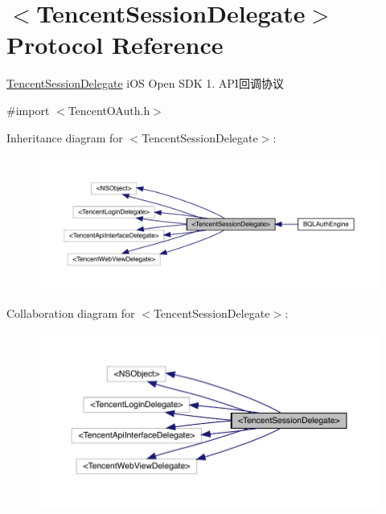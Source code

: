 \hypertarget{protocol_tencent_session_delegate-p}{}\section{$<$Tencent\+Session\+Delegate$>$ Protocol Reference}
\label{protocol_tencent_session_delegate-p}


\mbox{\hyperlink{protocol_tencent_session_delegate-p}{Tencent\+Session\+Delegate}} i\+OS Open S\+DK 1. A\+P\+I回调协议  




{\ttfamily \#import $<$Tencent\+O\+Auth.\+h$>$}



Inheritance diagram for $<$Tencent\+Session\+Delegate$>$\+:\nopagebreak
\begin{figure}[H]
\begin{center}
\leavevmode
\includegraphics[width=350pt]{protocol_tencent_session_delegate-p__inherit__graph}
\end{center}
\end{figure}


Collaboration diagram for $<$Tencent\+Session\+Delegate$>$\+:\nopagebreak
\begin{figure}[H]
\begin{center}
\leavevmode
\includegraphics[width=350pt]{protocol_tencent_session_delegate-p__coll__graph}
\end{center}
\end{figure}
